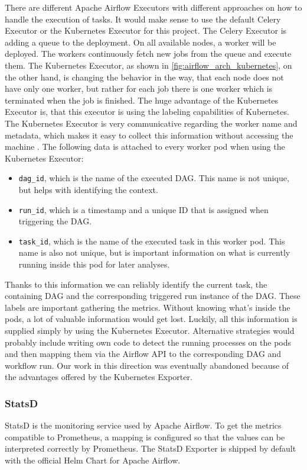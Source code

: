 \documentclass[a4paper,journal]{IEEEtran}
\begin{document}
There are different Apache Airflow Executors with different approaches on how to handle the execution of tasks. It would make sense to use the default Celery Executor or the Kubernetes Executor for this project. The Celery Executor is adding a queue to the deployment. On all available nodes, a worker will be deployed. The workers continuously fetch new jobs from the queue and execute them.  The Kubernetes Executor, as shown in \autoref{fig:airflow_arch_kubernetes}, on the other hand, is changing the behavior in the way, that each node does not have only one worker, but rather for each job there is one worker which is terminated when the job is finished. The huge advantage of the Kubernetes Executor is, that this executor is using the labeling capabilities of Kubernetes. The Kubernetes Executor is very communicative regarding the worker name and metadata, which makes it easy to collect this information without accessing the machine \cite{airflowExecutor}\cite{airflowExecutorKubernetes}.
The following data is attached to every worker pod when using the Kubernetes Executor:
\begin{itemize}
    \item \texttt{dag\_id}, which is the name of the executed DAG. This name is not unique, but helps with identifying the context.
    \item \texttt{run\_id}, which is a timestamp and a unique ID that is assigned when triggering the DAG.
    \item \texttt{task\_id}, which is the name of the executed task in this worker pod. This name is also not unique, but is important information on what is currently running inside this pod for later analyses.
\end{itemize}

Thanks to this information we can reliably identify the current task, the containing DAG and the corresponding triggered run instance of the DAG. These labels are important gathering the metrics. Without knowing what's inside the pods, a lot of valuable information would get lost. Luckily, all this information is supplied simply by using the Kubernetes Executor. Alternative strategies would probably include writing own code to detect the running processes on the pods and then mapping them via the Airflow API to the corresponding DAG and workflow run. Our work in this direction was eventually abandoned because of the advantages offered by the Kubernetes Exporter.

\subsubsection{StatsD}
StatsD is the monitoring service used by Apache Airflow. To get the metrics compatible to Prometheus, a mapping is configured so that the values can be interpreted correctly by Prometheus. The StatsD Exporter is shipped by default with the official Helm Chart for Apache Airflow.
\end{document}
